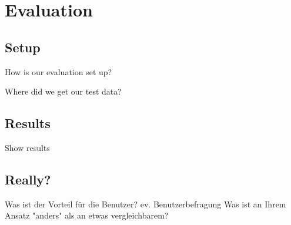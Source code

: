 \section{Evaluation}

\subsection{Setup}

How is our evaluation set up?

Where did we get our test data?


\subsection{Results}

Show results


\subsection{Really?}

Was ist der Vorteil für die Benutzer? ev. Benutzerbefragung
Was ist an Ihrem Ansatz "anders" als an etwas vergleichbarem?